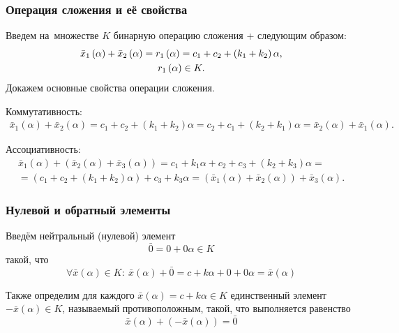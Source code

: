 \subsubsection*{Операция сложения и её свойства}

Введем на~множестве $K$ бинарную операцию сложения + следующим образом:
\begin{gather*}
  \bar{x}_1\left(\alpha \right)+\bar{x}_2\left(\alpha \right)=r_1\left( \alpha  \right)=c_1+c_2+\left(k_1+k_2 \right)\alpha, \notag \\ 
  r_1\left( \alpha  \right)\in K.
\end{gather*}
Докажем основные свойства операции сложения.

Коммутативность:
\begin{gather*}
\bar{x}_1\left( \alpha \right)+\bar{x}_2\left( \alpha \right)=c_1+c_2+\left(k_1+k_2\right)\alpha=c_2+c_1+\left(k_2+k_1 \right)\alpha =\bar{x}_2\left(\alpha \right)+\bar{x}_1\left(\alpha \right).
\end{gather*}

Ассоциативность:
\begin{gather*}
  \bar{x}_1\left(\alpha \right)+\left(\bar{x}_2\left(\alpha \right)+\bar{x}_3\left(\alpha \right) \right)=c_1+k_1\alpha +c_2+c_3+\left(k_2+k_3\right)\alpha={} \\ 
  {}=\left(c_1+c_2+\left(k_1+k_2\right)\alpha \right)+c_3+k_3\alpha =\left(\bar{x}_1\left(\alpha \right)+\bar{x}_2\left(\alpha \right) \right)+\bar{x}_3\left(\alpha \right).
\end{gather*}

\subsubsection*{Нулевой и обратный элементы}

Введём нейтральный (нулевой) элемент
\begin{equation}
\label{eq:fuzzy-kc-zero}
	\bar{0}=0+0\alpha \in K
\end{equation}
такой, что 
\begin{equation}
\label{eq:fuzzy-kc-zeroprop}
	\forall \bar{x}(\alpha )\in K:\ \bar{x}(\alpha )+\bar{0}=c+k\alpha +0+0\alpha =\bar{x}(\alpha )
\end{equation}

Также определим для каждого $\bar{x}\left( \alpha  \right)=c+k\alpha \in K$ единственный элемент $-\bar{x}\left(\alpha \right)\in K$, называемый противоположным, такой, что выполняется равенство
\begin{equation}
\label{eq:fuzzy-kc-inverse-minus}
	\bar{x}\left( \alpha  \right)+\left( -\bar{x}\left( \alpha  \right) \right)=\bar{0}
\end{equation}

